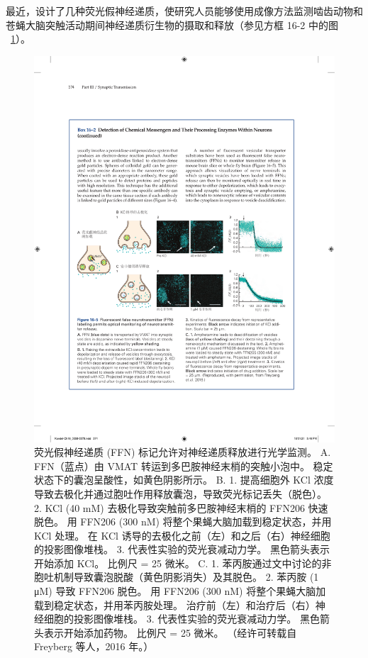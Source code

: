 最近，设计了几种荧光假神经递质，使研究人员能够使用成像方法监测啮齿动物和苍蝇大脑突触活动期间神经递质衍生物的摄取和释放（参见方框 16-2 中的图 ~\ref{fig:16_5}）。


\begin{figure}[htbp]
	\centering
	\includegraphics[width=0.85\linewidth]{chap16/fig_16_5}
	\caption{荧光假神经递质 (FFN) 标记允许对神经递质释放进行光学监测。 A. FFN（蓝点）由 VMAT 转运到多巴胺神经末梢的突触小泡中。 稳定状态下的囊泡呈酸性，如黄色阴影所示。 B. 1. 提高细胞外 KCl 浓度导致去极化并通过胞吐作用释放囊泡，导致荧光标记丢失（脱色）。 2. KCl (40 mM) 去极化导致突触前多巴胺神经末梢的 FFN206 快速脱色。 用 FFN206 (300 nM) 将整个果蝇大脑加载到稳定状态，并用 KCl 处理。 在 KCl 诱导的去极化之前（左）和之后（右）神经细胞的投影图像堆栈。 3. 代表性实验的荧光衰减动力学。 黑色箭头表示开始添加 KCl。 比例尺 = 25 微米。 C. 1. 苯丙胺通过文中讨论的非胞吐机制导致囊泡脱酸（黄色阴影消失）及其脱色。 2. 苯丙胺 (1 μM) 导致 FFN206 脱色。 用 FFN206 (300 nM) 将整个果蝇大脑加载到稳定状态，并用苯丙胺处理。 治疗前（左）和治疗后（右）神经细胞的投影图像堆栈。 3. 代表性实验的荧光衰减动力学。 黑色箭头表示开始添加药物。 比例尺 = 25 微米。 （经许可转载自 Freyberg 等人，2016 年。）}
	\label{fig:16_5}
\end{figure}


